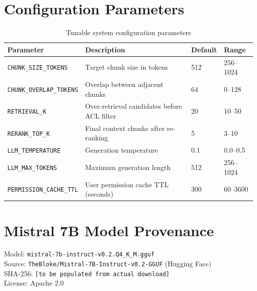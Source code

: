 \section*{Configuration Parameters}

\begin{table}[H]
\centering
\caption{Tunable system configuration parameters}
\begin{tabularx}{\textwidth}{@{}lXll@{}}
\toprule
\textbf{Parameter} & \textbf{Description} & \textbf{Default} & \textbf{Range} \\
\midrule
\texttt{CHUNK\_SIZE\_TOKENS} & Target chunk size in tokens & 512 & 256--1024 \\
\texttt{CHUNK\_OVERLAP\_TOKENS} & Overlap between adjacent chunks & 64 & 0--128 \\
\texttt{RETRIEVAL\_K} & Over-retrieval candidates before ACL filter & 20 & 10--50 \\
\texttt{RERANK\_TOP\_K} & Final context chunks after re-ranking & 5 & 3--10 \\
\texttt{LLM\_TEMPERATURE} & Generation temperature & 0.1 & 0.0--0.5 \\
\texttt{LLM\_MAX\_TOKENS} & Maximum generation length & 512 & 256--1024 \\
\texttt{PERMISSION\_CACHE\_TTL} & User permission cache TTL (seconds) & 300 & 60--3600 \\
\bottomrule
\end{tabularx}
\end{table}

\section*{Mistral 7B Model Provenance}

Model: \texttt{mistral-7b-instruct-v0.2.Q4\_K\_M.gguf}\\
Source: \texttt{TheBloke/Mistral-7B-Instruct-v0.2-GGUF} (Hugging Face)\\
SHA-256: \texttt{[to be populated from actual download]}\\
License: Apache 2.0
